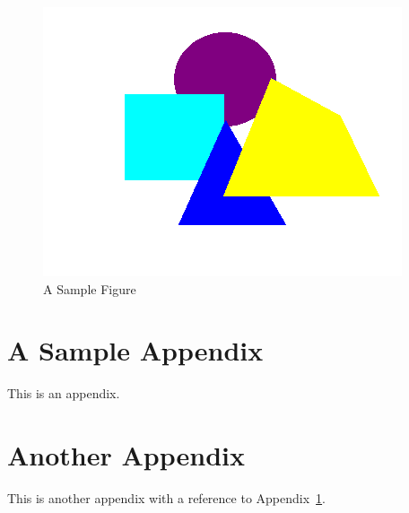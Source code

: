 \documentclass[oneside,numbers=noenddot]{scrbook}
\begin{document}
\begin{figure}[htbp]
\centering
\includegraphics[scale=0.5,angle=45]{shapes}
\caption{A Sample Figure}\label{fig:shapes}
\end{figure}

\lipsum

\appendix %

\chapter{A Sample Appendix}\label{apd:sample}

This is an appendix. \lipsum

\chapter{Another Appendix}

This is another appendix with a reference to Appendix~\ref{apd:sample}. \lipsum
\end{document}
